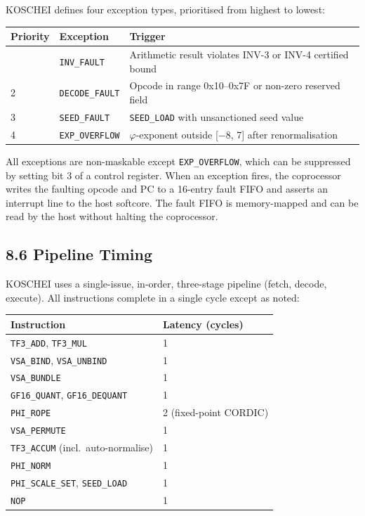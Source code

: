 KOSCHEI defines four exception types, prioritised
from highest to lowest:

\begin{longtable}[]{@{}llp{6cm}@{}}
\toprule\noalign{}
Priority & Exception & Trigger \\
\midrule\noalign{}
\endhead
\bottomrule\noalign{}
\endlastfoot
1 & \texttt{INV\_FAULT} & Arithmetic result
violates INV-3 or INV-4 certified bound \\
2 & \texttt{DECODE\_FAULT} & Opcode in range
0x10--0x7F or non-zero reserved field \\
3 & \texttt{SEED\_FAULT} & \texttt{SEED\_LOAD}
with unsanctioned seed value \\
4 & \texttt{EXP\_OVERFLOW} &
\(\varphi\)-exponent outside {[}−8, 7{]} after
renormalisation \\
\end{longtable}

All exceptions are non-maskable except
\texttt{EXP\_OVERFLOW}, which can be suppressed by
setting bit 3 of a control register. When an
exception fires, the coprocessor writes the faulting
opcode and PC to a 16-entry fault FIFO and asserts
an interrupt line to the host softcore. The fault
FIFO is memory-mapped and can be read by the host
without halting the coprocessor.

\subsection{8.6 Pipeline
Timing}\label{fa_26:pipeline-timing}

KOSCHEI uses a single-issue, in-order, three-stage
pipeline (fetch, decode, execute). All instructions
complete in a single cycle except as noted:

\begin{longtable}[]{@{}ll@{}}
\toprule\noalign{}
Instruction & Latency (cycles) \\
\midrule\noalign{}
\endhead
\bottomrule\noalign{}
\endlastfoot
\texttt{TF3\_ADD}, \texttt{TF3\_MUL} & 1 \\
\texttt{VSA\_BIND}, \texttt{VSA\_UNBIND} & 1 \\
\texttt{VSA\_BUNDLE} & 1 \\
\texttt{GF16\_QUANT}, \texttt{GF16\_DEQUANT} & 1 \\
\texttt{PHI\_ROPE} & 2 (fixed-point CORDIC) \\
\texttt{VSA\_PERMUTE} & 1 \\
\texttt{TF3\_ACCUM} (incl.\ auto-normalise) & 1 \\
\texttt{PHI\_NORM} & 1 \\
\texttt{PHI\_SCALE\_SET}, \texttt{SEED\_LOAD} & 1 \\
\texttt{NOP} & 1 \\
\end{longtable}

